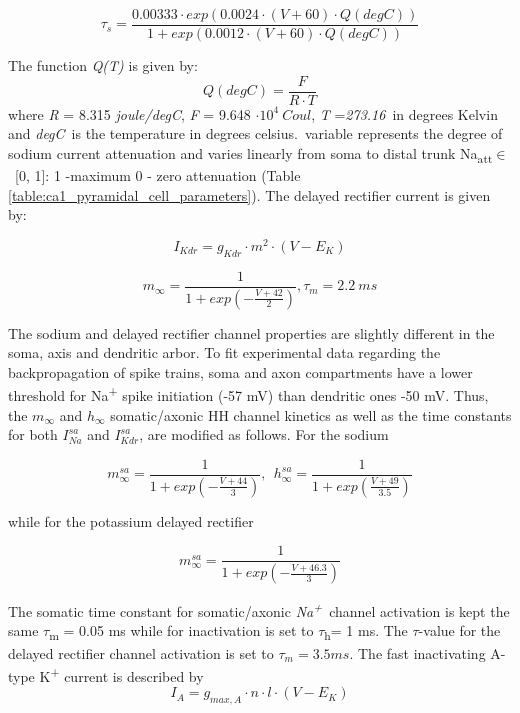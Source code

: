 \documentclass[a4paper,12pt]{article}
\begin{document}
\begin{equation}
\tau_s=\frac{0.00333\cdot  exp(0.0024 \cdot (V+60)\cdot
		Q(degC))}{1+exp(0.0012 \cdot (V+60)\cdot Q(degC))}
\end{equation}

The function \textit{Q(T)} is given by:
\begin{equation}
\label{eq:QT}
Q(degC)= \frac{F}{ R \cdot T }
\end{equation}
where \textit{R }=\textit{ }8.315\textit{ joule/degC}, \textit{F }=\textit{ }9.648 $\cdot 10^4 \ Coul$,
\textit{T }=\textit{273.16}~in degrees Kelvin and \textit{degC}~is the temperature in degrees celsius.~variable represents the degree of sodium current
attenuation and varies linearly from soma to distal trunk
Na\textsubscript{att}$\in$~[0, 1]: 1 -maximum 0 - zero attenuation (Table \ref{table:ca1_pyramidal_cell_parameters}). The delayed rectifier current is given by:

\begin{equation}
I_{Kdr} = g_{Kdr} \cdot m^2 \cdot (V-E_K)
\end{equation}

\begin{equation}
m_{\infty}=\frac{1}{1+exp(-\frac{V+42}{2})}, \tau_m = 2.2 \ ms
\end{equation}

The sodium and delayed rectifier channel properties are slightly different in the soma, axis and dendritic arbor. To fit
experimental data regarding the backpropagation of spike trains, soma and axon compartments have a lower threshold for
Na\textsuperscript{+} spike initiation (-57 mV) than dendritic ones -50 mV. Thus, the $m_{\infty}$ and $h_{\infty}$
somatic/axonic HH channel kinetics as well as the time constants for both $I_{Na}^{sa}$ and $I_{Kdr}^{sa}$, are modified as follows. For the sodium

\begin{equation}
m_{\infty}^{sa}=\frac {1}{1+exp(-\frac{V+44}{3})} ,\ \ 
h_{\infty}^{sa}=\frac {1}{1+exp(\frac{V+49}{3.5})}
\end{equation}

while for the potassium delayed rectifier

\begin{equation}
m_{\infty}^{sa}=\frac {1}{1+exp(-\frac{V+46.3}{3})}
\end{equation}

The somatic time constant for somatic/axonic \textit{Na}\textit{\textsuperscript{+}}~channel activation is kept the
same $\tau$\textsubscript{m} = 0.05 ms while for inactivation is set to $\tau$\textsubscript{h}= 1 ms. The $\tau$-value for the delayed rectifier channel activation is set to $\tau_{m}= 3.5 ms$.
The fast inactivating A-type K\textsuperscript{+ }current is described by
\begin{equation}
I_A = g_{max, A} \cdot n \cdot l \cdot (V - E_K)
\end{equation}
\end{document}
